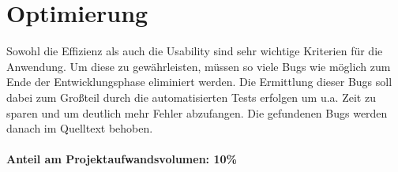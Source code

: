 \section{Optimierung}
Sowohl die Effizienz als auch die Usability sind sehr wichtige Kriterien für die Anwendung. Um diese zu gewährleisten, müssen so viele Bugs wie möglich zum Ende der Entwicklungsphase eliminiert werden. Die Ermittlung dieser Bugs soll dabei zum Großteil durch die automatisierten Tests erfolgen um u.a. Zeit zu sparen und um deutlich mehr Fehler abzufangen. Die gefundenen Bugs werden danach im Quelltext behoben. \\ \\
\textbf{Anteil am Projektaufwandsvolumen: 10\%}
